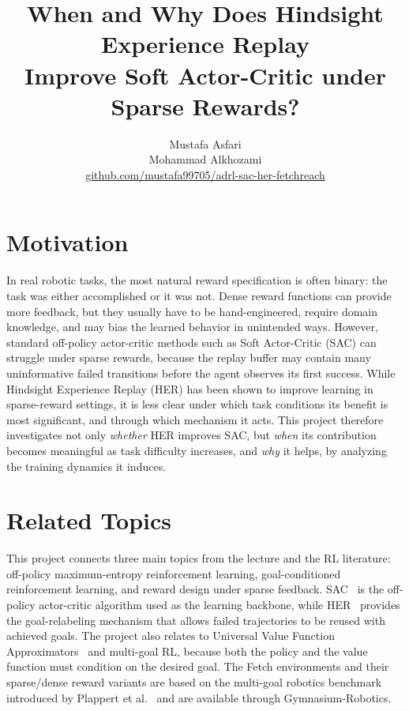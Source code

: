 \documentclass{article}
\title{When and Why Does Hindsight Experience Replay\\
Improve Soft Actor-Critic under Sparse Rewards?}
\author{Mustafa Asfari \\ Mohammad Alkhozami \\
\url{github.com/mustafa99705/adrl-sac-her-fetchreach}}
\begin{document}
\maketitle

\section{Motivation}
In real robotic tasks, the most natural reward specification is often binary:
the task was either accomplished or it was not. Dense reward functions can
provide more feedback, but they usually have to be hand-engineered, require
domain knowledge, and may bias the learned behavior in unintended ways.
However, standard off-policy actor-critic methods such as Soft Actor-Critic
(SAC) can struggle under sparse rewards, because the replay buffer may contain
many uninformative failed transitions before the agent observes its first
success. While Hindsight Experience Replay (HER) has been shown to improve
learning in sparse-reward settings, it is less clear under which task
conditions its benefit is most significant, and through which mechanism it
acts. This project therefore investigates not only \emph{whether} HER improves
SAC, but \emph{when} its contribution becomes meaningful as task difficulty
increases, and \emph{why} it helps, by analyzing the training dynamics it
induces.

\section{Related Topics}
This project connects three main topics from the lecture and the RL
literature: off-policy maximum-entropy reinforcement learning,
goal-conditioned reinforcement learning, and reward design under sparse
feedback. SAC~\cite{haarnoja18} is the off-policy actor-critic algorithm used
as the learning backbone, while HER~\cite{andrychowicz17} provides the
goal-relabeling mechanism that allows failed trajectories to be reused with
achieved goals. The project also relates to Universal Value Function
Approximators~\cite{schaul15} and multi-goal RL, because both the policy and
the value function must condition on the desired goal. The Fetch environments
and their sparse/dense reward variants are based on the multi-goal robotics
benchmark introduced by Plappert et al.~\cite{plappert18} and are available
through Gymnasium-Robotics.
\end{document}
